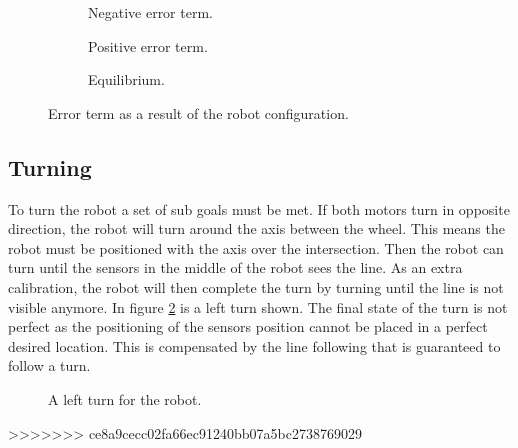 \begin{figure}
 \begin{subfigure}{0.32\textwidth}
 \centering
  \caption{Negative error term.}
 \end{subfigure}
 \begin{subfigure}{0.32\textwidth}
 \centering
  \caption{Positive error term.}
 \end{subfigure}
 \begin{subfigure}{0.32\textwidth}
 \centering
  \caption{Equilibrium.}
 \end{subfigure}
\caption{Error term as a result of the robot configuration.}
\label{fig:line_follow}
\end{figure}


\subsection{Turning}
To turn the robot a set of sub goals must be met.
If both motors turn in opposite direction, the robot will turn around the axis between the wheel.
This means the robot must be positioned with the axis over the intersection.
Then the robot can turn until the sensors in the middle of the robot sees the line.
As an extra calibration, the robot will then complete the turn by turning until the line is not visible anymore.
In figure \ref{fig:left_turn} is a left turn shown.
The final state of the turn is not perfect as the positioning of the sensors position cannot be placed in a perfect desired location.
This is compensated by the line following that is guaranteed to follow a turn.

\begin{figure}

 \caption{A left turn for the robot.}
 \label{fig:left_turn}
\end{figure}

>>>>>>> ce8a9cecc02fa66ec91240bb07a5bc2738769029
